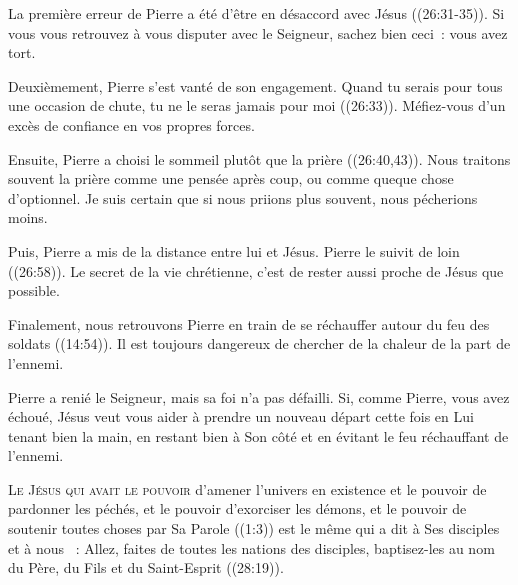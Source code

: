 La première erreur de Pierre a été d'être en désaccord avec Jésus
 ((26:31-35)).
 Si vous vous retrouvez à vous disputer avec le Seigneur,
 sachez bien ceci~: vous avez tort. 


Deuxièmement, Pierre s'est vanté de son engagement.
 \og Quand tu serais pour tous une occasion de chute,
 tu ne le seras jamais pour moi \fg{} ((26:33)).
 Méfiez-vous d'un excès de confiance en vos propres forces. 

Ensuite, Pierre a choisi le sommeil plutôt que la prière
 ((26:40,43)).
 Nous traitons souvent la prière comme une pensée après coup,
 ou comme queque chose d'optionnel.
 Je suis certain que si nous priions plus souvent, nous pécherions moins. 

Puis, Pierre a mis de la distance entre lui et Jésus.
 \og Pierre le suivit de loin \fg{} ((26:58)).
 Le secret de la vie chrétienne, 
 c'est de rester aussi proche de Jésus que possible. 

Finalement, nous retrouvons Pierre en train de se réchauffer
 autour du feu des soldats ((14:54)).
 Il est toujours dangereux de chercher de la chaleur de la part de l'ennemi. 

Pierre a renié le Seigneur, mais sa foi n'a pas défailli.
 Si, comme Pierre, vous avez échoué, Jésus veut vous aider
 à prendre un nouveau départ \ocadr cette fois en Lui tenant bien la main,
 en restant bien à Son côté et en évitant le feu réchauffant de l'ennemi. 

\dvrule






\lettrine{L}{e Jésus qui avait le pouvoir} d'amener l'univers
 en existence et le pouvoir de pardonner les péchés,
 et le pouvoir d'exorciser les démons, et le pouvoir de soutenir
 toutes choses par Sa Parole ((1:3))
 est le même qui a dit à Ses disciples \ocadr et à nous \fcadr{}~: 
 \og Allez, faites de toutes les nations des disciples,
 baptisez-les au nom du Père, du Fils et du Saint-Esprit \fg{}
 ((28:19)). 

